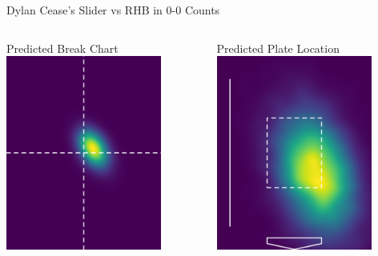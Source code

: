 \documentclass{beamer}
\begin{document}
  \begin{frame}{Dylan Cease's Slider vs RHB in 0-0 Counts}
    \begin{columns}
      \begin{column}{0.5\textwidth}
        \centering
        Predicted Break Chart\\
        \vspace{4mm}
        \includegraphics[width = 0.8\textwidth]{images/656302_SL_R_0_0_break.png}
      \end{column}
      \begin{column}{0.5\textwidth}
        \centering
        Predicted Plate Location\\
        \vspace{4mm}
        \includegraphics[width = 0.8\textwidth]{images/656302_SL_R_0_0_plate.png}

\end{column}
\end{columns}
\end{frame}
\end{document}
